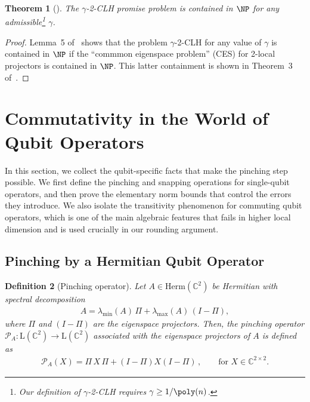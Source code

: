 \documentclass[11pt]{article}
\theoremstyle{plain}
\newtheorem{theorem}{Theorem}[section]
\newtheorem{definition}[theorem]{Definition}
\newcommand{\AnandNote}[1]{\textcolor{red}{(Anand: #1)}}
\newcommand{\AnandNote}[1]{}
\begin{document}

\begin{theorem}[\cite{bravyi2004commutativeversionklocalhamiltonian}]
\label{thm:clh-in-np}
    The $\gamma$-2-CLH promise problem is contained in $\NP$ for any admissible\footnote{Our definition of $\gamma$-2-CLH requires $\gamma \geq 1/\poly(n)$.} $\gamma$.
\end{theorem}
\begin{proof}
    Lemma~5 of~\cite{bravyi2004commutativeversionklocalhamiltonian} shows that the problem $\gamma$-2-CLH for any value of $\gamma$ is contained in $\NP$ if the ``commmon eigenspace problem'' (CES) for 2-local projectors is contained in $\NP$. This latter containment is shown in Theorem~3 of~\cite{bravyi2004commutativeversionklocalhamiltonian}.
\end{proof}


\section{Commutativity in the World of Qubit Operators}

In this section, we collect the qubit-specific facts that make the
pinching step possible.  We first define the pinching and snapping
operations for single-qubit operators, and then prove the elementary norm
bounds that control the errors they introduce.  We also isolate the
transitivity phenomenon for commuting qubit operators, which is one of the
main algebraic features that fails in higher local dimension and is used
crucially in our rounding argument.

\subsection{Pinching by a Hermitian Qubit Operator}

\begin{definition}[Pinching operator]\label{def:pinching-operator}
Let $A \in \mathrm{Herm}(\mathbb{C}^{2})$ be Hermitian with spectral decomposition 
\begin{align}
A = \lambda_{\min}(A)\,\Pi + \lambda_{\max}(A)\,(I-\Pi),
\end{align}
where $\Pi$ and $(I-\Pi)$ are the eigenspace projectors. Then, the pinching operator $\mathcal{P}_A: \mathrm{L}(\mathbb{C}^{2})\rightarrow \mathrm{L}(\mathbb{C}^{2})$ associated with the eigenspace projectors of $A$ is defined as
\begin{align}
    \mathcal{P}_A(X) = \Pi \, X \, \Pi + (I-\Pi) X (I-\Pi)\, , \quad\quad \text{for } X \in \mathbb{C}^{2 \times 2}.
    \end{align}
    
\end{definition}
\end{document}
